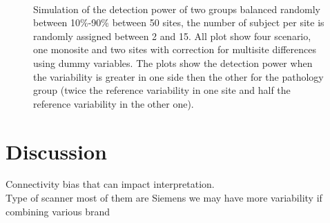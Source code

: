 \documentclass[authoryear]{elsarticle}
\begin{document}
\begin{figure}[tbp]
   \centering
    \captionsetup[subfloat]{labelformat=empty}
     \\
     \caption{
     Simulation of the detection power of two groups balanced randomly between 10\%-90\% between 50 sites, the number of subject per site is randomly assigned between 2 and 15. All plot show four scenario, one monosite and two sites with correction for multisite differences using dummy variables. The plots show the detection power when the variability is greater in one side then the other for the pathology group (twice the reference variability in one site and half the reference variability in the other one).
}
     \label{fig_full_sim_50sites_rnd_debalancing}
\end{figure}

\section{Discussion}

Connectivity bias that can impact interpretation.\\

Type of scanner most of them are Siemens we may have more variability if combining various brand\\
\end{document}
